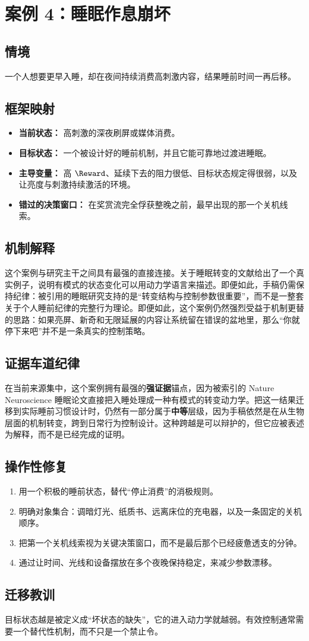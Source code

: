 \section{案例 4：睡眠作息崩坏}

\subsection*{情境}
一个人想要更早入睡，却在夜间持续消费高刺激内容，结果睡前时间一再后移。

\subsection*{框架映射}
\begin{itemize}[nosep]
  \item \textbf{当前状态：} 高刺激的深夜刷屏或媒体消费。
  \item \textbf{目标状态：} 一个被设计好的睡前机制，并且它能可靠地过渡进睡眠。
  \item \textbf{主导变量：} 高 $\Reward$、延续下去的阻力很低、目标状态规定得很弱，以及让亮度与刺激持续激活的环境。
  \item \textbf{错过的决策窗口：} 在奖赏流完全俘获整晚之前，最早出现的那一个关机线索。
\end{itemize}

\subsection*{机制解释}
这个案例与研究主干之间具有最强的直接连接。关于睡眠转变的文献给出了一个真实例子，说明有模式的状态变化可以用动力学语言来描述。即便如此，手稿仍需保持纪律：被引用的睡眠研究支持的是“转变结构与控制参数很重要”，而不是一整套关于个人睡前纪律的完整行为理论。即便如此，这个案例仍然强烈受益于机制更替的思路：如果亮屏、新奇和无限延展的内容让系统留在错误的盆地里，那么“你就停下来吧”并不是一条真实的控制策略。

\subsection*{证据车道纪律}
在当前来源集中，这个案例拥有最强的\textbf{强证据}锚点，因为被索引的 Nature Neuroscience 睡眠论文直接把入睡处理成一种有模式的转变动力学。把这一结果迁移到实际睡前习惯设计时，仍然有一部分属于\textbf{中等}层级，因为手稿依然是在从生物层面的机制转变，跨到日常行为控制设计。这种跨越是可以辩护的，但它应被表述为解释，而不是已经完成的证明。

\subsection*{操作性修复}
\begin{enumerate}[nosep]
  \item 用一个积极的睡前状态，替代“停止消费”的消极规则。
  \item 明确对象集合：调暗灯光、纸质书、远离床位的充电器，以及一条固定的关机顺序。
  \item 把第一个关机线索视为关键决策窗口，而不是最后那个已经疲惫透支的分钟。
  \item 通过让时间、光线和设备摆放在多个夜晚保持稳定，来减少参数漂移。
\end{enumerate}

\subsection*{迁移教训}
目标状态越是被定义成“坏状态的缺失”，它的进入动力学就越弱。有效控制通常需要一个替代性机制，而不只是一个禁止令。